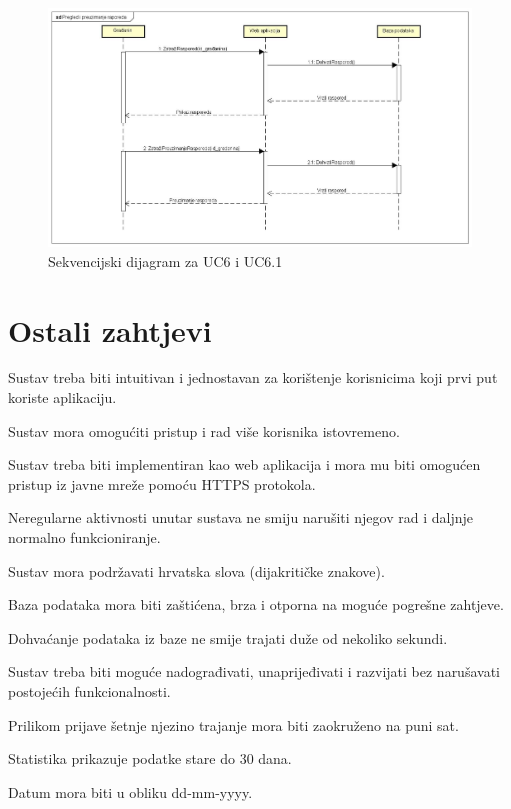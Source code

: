 				\begin{figure}[H]
					\includegraphics[width=\linewidth]{slike/SEK-6-6.1.jpg}
					\centering
					\caption{Sekvencijski dijagram za UC6 i UC6.1}
					\label{fig:sek-6-6.1}
				\end{figure}
				
				\eject
	
		\section{Ostali zahtjevi}
			 
			 
			 
			 \begin{packed_item}
			 	
			 	\item Sustav treba biti intuitivan i jednostavan za korištenje korisnicima koji prvi put koriste aplikaciju.
			 	\item Sustav mora omogućiti pristup i rad više korisnika istovremeno.
			 	\item Sustav treba biti implementiran kao web aplikacija i mora mu biti omogućen pristup iz javne mreže pomoću HTTPS protokola.
			 	\item Neregularne aktivnosti unutar sustava ne smiju narušiti njegov rad i daljnje normalno funkcioniranje.
			 	\item Sustav mora podržavati hrvatska slova (dijakritičke znakove).
			 	\item Baza podataka mora biti zaštićena, brza i otporna na moguće pogrešne zahtjeve.
			 	\item Dohvaćanje podataka iz baze ne smije trajati duže od nekoliko sekundi. 
			 	\item Sustav treba biti moguće nadograđivati, unaprijeđivati i razvijati bez narušavati postojećih funkcionalnosti.
			 	\item Prilikom prijave šetnje njezino trajanje mora biti zaokruženo na puni sat.
			 	\item Statistika prikazuje podatke stare do 30 dana.
			 	\item Datum mora biti u obliku dd-mm-yyyy.
			 	
			 \end{packed_item}


			 
			 
			 
	